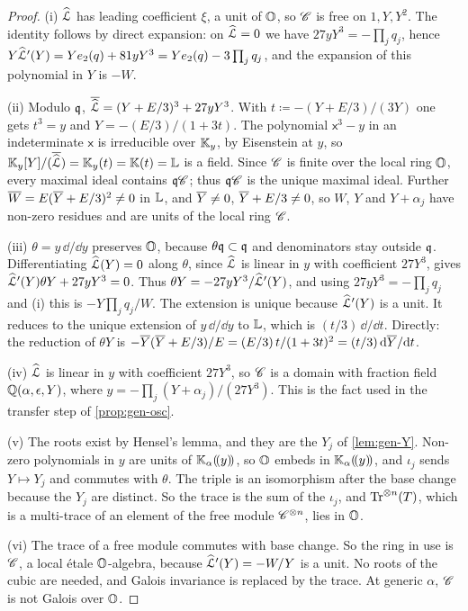 \begin{proof}
(i) $\widehat{\mathcal{L}}$ has leading coefficient $\xi$, a unit of $\mathbb{O}$, so $\mathscr{C}$ is free on $1,Y,Y^2$. The identity follows by direct expansion: on $\widehat{\mathcal{L}}=0$ we have $27yY^3=-\prod_jq_j$, hence $Y\widehat{\mathcal{L}}'(Y)=Ye_2(q)+81yY^3=Ye_2(q)-3\prod_jq_j$, and the expansion of this polynomial in $Y$ is $-W$.

(ii) Modulo $\mathfrak{q}$, $\overline{\widehat{\mathcal{L}}}=(Y+E/3)^3+27yY^3$. With $t\coloneqq-(Y+E/3)/(3Y)$ one gets $t^3=y$ and $Y=-(E/3)/(1+3t)$. The polynomial $\mathsf{x}^3-y$ in an indeterminate $\mathsf{x}$ is irreducible over $\mathbb{K}_{y}$, by Eisenstein at $y$, so $\mathbb{K}_{y}[Y]/(\overline{\widehat{\mathcal{L}}})=\mathbb{K}_{y}(t)=\mathbb{K}(t)=\mathbb{L}$ is a field. Since $\mathscr{C}$ is finite over the local ring $\mathbb{O}$, every maximal ideal contains $\mathfrak{q}\mathscr{C}$; thus $\mathfrak{q}\mathscr{C}$ is the unique maximal ideal. Further $\overline{W}=E(\overline{Y}+E/3)^2\neq0$ in $\mathbb{L}$, and $\overline{Y}\neq0$, $\overline{Y}+E/3\neq0$, so $W$, $Y$ and $Y+\alpha_j$ have non-zero residues and are units of the local ring $\mathscr{C}$.

(iii) $\theta=y\,\dd/\dd y$ preserves $\mathbb{O}$, because $\theta\mathfrak{q}\subset\mathfrak{q}$ and denominators stay outside $\mathfrak{q}$. Differentiating $\widehat{\mathcal{L}}(Y)=0$ along $\theta$, since $\widehat{\mathcal{L}}$ is linear in $y$ with coefficient $27Y^3$, gives $\widehat{\mathcal{L}}'(Y)\theta Y+27yY^3=0$. Thus $\theta Y=-27yY^3/\widehat{\mathcal{L}}'(Y)$, and using $27yY^3=-\prod_jq_j$ and (i) this is $-Y\prod_jq_j/W$. The extension is unique because $\widehat{\mathcal{L}}'(Y)$ is a unit. It reduces to the unique extension of $y\,\dd/\dd y$ to $\mathbb{L}$, which is $(t/3)\,\dd/\dd t$. Directly: the reduction of $\theta Y$ is $-\overline{Y}(\overline{Y}+E/3)/E=(E/3)\,t/(1+3t)^2=(t/3)\,\mathrm{d}\overline{Y}/\mathrm{d} t$.

(iv) $\widehat{\mathcal{L}}$ is linear in $y$ with coefficient $27Y^3$, so $\mathscr{C}$ is a domain with fraction field $\mathbb{Q}(\alpha,\epsilon,Y)$, where $y=-\prod_j(Y+\alpha_j)/(27Y^3)$. This is the fact used in the transfer step of \cref{prop:gen-osc}.

(v) The roots exist by Hensel's lemma, and they are the $Y_j$ of \cref{lem:gen-Y}. Non-zero polynomials in $y$ are units of $\mathbb{K}_{\alpha}(\!(y)\!)$, so $\mathbb{O}$ embeds in $\mathbb{K}_{\alpha}(\!(y)\!)$, and $\iota_j$ sends $Y\mapsto Y_j$ and commutes with $\theta$. The triple is an isomorphism after the base change because the $Y_j$ are distinct. So the trace is the sum of the $\iota_j$, and $\operatorname{Tr}^{\otimes n}(T)$, which is a multi-trace of an element of the free module $\mathscr{C}^{\otimes n}$, lies in $\mathbb{O}$.

(vi) The trace of a free module commutes with base change. So the ring in use is $\mathscr{C}$, a local \'etale $\mathbb{O}$-algebra, because $\widehat{\mathcal{L}}'(Y)=-W/Y$ is a unit. No roots of the cubic are needed, and Galois invariance is replaced by the trace. At generic $\alpha$, $\mathscr{C}$ is not Galois over $\mathbb{O}$.
\end{proof}

